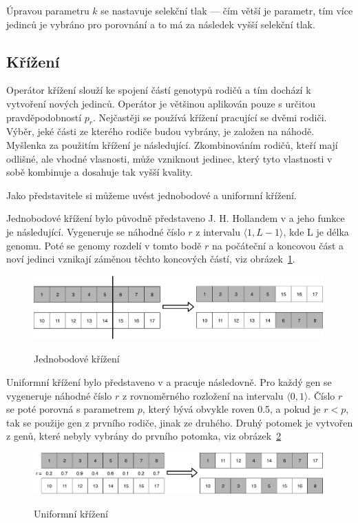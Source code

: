 Úpravou parametru $k$ se nastavuje selekční tlak --- čím větší je parametr, tím více jedinců je vybráno pro porovnání a to má za následek vyšší selekční tlak.

\subsection{Křížení}
Operátor křížení slouží ke spojení částí genotypů rodičů a tím dochází k vytvoření nových jedinců.
Operátor je většinou aplikován pouze s určitou pravděpodobností $p_r$.
Nejčastěji se používá křížení pracující se dvěmi rodiči.
Výběr, jeké části ze kterého rodiče budou vybrány, je založen na náhodě.
Myšlenka za použitím křížení je následující.
Zkombinováním rodičů, kteří mají odlišné, ale vhodné vlasnosti, může vzniknout jedinec, který tyto vlastnosti v sobě kombinuje a dosahuje tak vyšší kvality.

Jako představitele si můžeme uvést jednobodové a uniformní křížení.

Jednobodové křížení bylo původně představeno J. H. Hollandem v  a jeho funkce je následující.
Vygeneruje se náhodné číslo $r$ z intervalu $\langle 1, L-1\rangle$, kde L je délka genomu.
Poté se genomy rozdelí v tomto bodě $r$ na počáteční a koncovou část a noví jedinci vznikají záměnou těchto koncových částí, viz obrázek~\ref{fig:jednobodove_krizeni}.

\begin{figure}[h]
    \centering
    {\includegraphics[width=30em]{obrazky/jedobodove_krizeni.pdf}}
    \caption{
    Jednobodové křížení
    }
    \label{fig:jednobodove_krizeni}
\end{figure}

Uniformní křížení bylo představeno v  a pracuje následovně.
Pro každý gen se vygeneruje náhodné číslo $r$ z rovnoměrného rozložení na intervalu $\langle 0, 1\rangle$.
Číslo $r$ se poté porovná s parametrem $p$, který bývá obvykle roven 0.5, a pokud je $r < p$, tak se použije gen z prvního rodiče, jinak ze druhého.
Druhý potomek je vytvořen z genů, které nebyly vybrány do prvního potomka, viz obrázek~\ref{fig:uniformni_krizeni}

\begin{figure}[h]
    \centering
    {\includegraphics[width=30em]{obrazky/uniformni_krizeni.pdf}}
    \caption{
    Uniformní křížení
    }
    \label{fig:uniformni_krizeni}
\end{figure}


